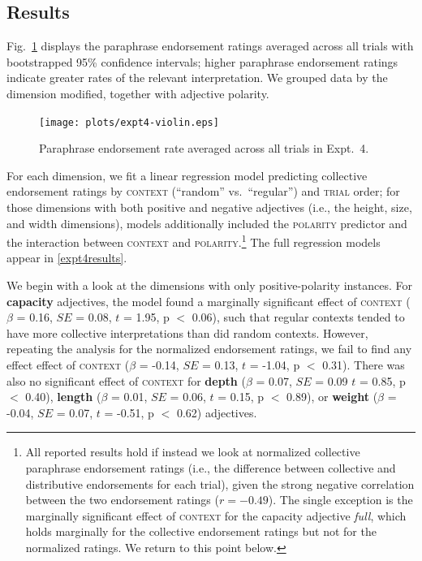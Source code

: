\documentclass[preprint,12pt,authoryear,titlepage]{elsarticle}
\newcommand{\ndg}[1]{\textcolor{Green}{[ndg: #1]}}
\begin{document}
\subsection{Results}

Fig.\ \ref{resultsexpt4} displays the paraphrase endorsement ratings averaged across all trials with bootstrapped 95\% confidence intervals; higher paraphrase endorsement ratings indicate greater rates of the relevant interpretation. We grouped data by the dimension modified, together with adjective polarity.


\begin{figure}[h]
	\centering
	\texttt{[image: plots/expt4-violin.eps]} 
	\vspace{-35pt}
	\caption{Paraphrase endorsement rate averaged across all trials in Expt.~4.}\label{resultsexpt4}
\end{figure}

For each dimension, we fit a linear regression model predicting collective endorsement ratings by \textsc{context} (``random'' vs.~``regular'') and \textsc{trial} order; for those dimensions with both positive and negative adjectives (i.e., the height, size, and width dimensions), models additionally included the \textsc{polarity} predictor and the interaction between \textsc{context} and \textsc{polarity}.\footnote{All reported results hold if instead we look at normalized collective paraphrase endorsement ratings (i.e., the difference between collective and distributive endorsements for each trial), given the strong negative correlation between the two endorsement ratings ($r=-0.49$). The single exception is the marginally significant effect of \textsc{context} for the capacity adjective \emph{full}, which holds marginally for the collective endorsement ratings but not for the normalized ratings. We return to this point below.} The full regression models appear in \ref{expt4results}.

We begin with a look at the dimensions with only positive-polarity instances. For \textbf{capacity} adjectives, the model found a marginally significant effect of \textsc{context} ($\beta$ = 0.16, $SE$ = 0.08, $t$ = 1.95, p $<$ 0.06), such that regular contexts tended to have more collective interpretations than did random contexts. However, repeating the analysis for the normalized endorsement ratings, we fail to find any effect effect of \textsc{context} ($\beta$ = -0.14, $SE$ = 0.13, $t$ = -1.04, p $<$ 0.31). There was also no significant effect of \textsc{context} for \textbf{depth} ($\beta$ = 0.07, $SE$ = 0.09 $t$ = 0.85, p $<$ 0.40), \textbf{length} ($\beta$ = 0.01, $SE$ = 0.06, $t$ = 0.15, p $<$ 0.89), or \textbf{weight} ($\beta$ = -0.04, $SE$ = 0.07, $t$ = -0.51, p $<$ 0.62) adjectives.
\end{document}
